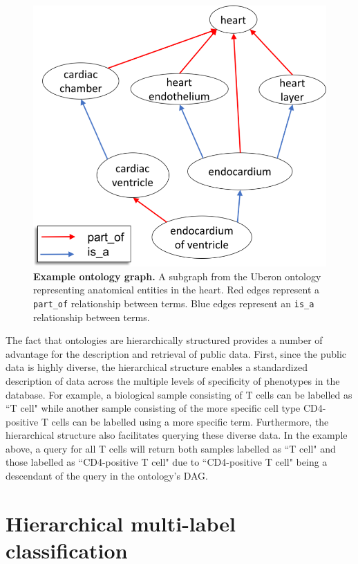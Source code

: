 \begin{figure}[!tpb]
\centerline{\includegraphics[scale=0.68]{figures/onto_schematic.png}}
\caption{\textbf{Example ontology graph.} A subgraph from the Uberon ontology representing anatomical entities in the heart. Red edges represent a \texttt{part\_of} relationship between terms. Blue edges represent an \texttt{is\_a} relationship between terms. }
\label{fig:onto_schem}
\end{figure}

The fact that ontologies are hierarchically structured provides a number of advantage for the description and retrieval of public data. First, since the public data is highly diverse, the hierarchical structure enables a standardized description of data across the multiple levels of specificity of phenotypes in the database.  For example, a biological sample consisting of T cells can be labelled as ``T cell" while another sample consisting of the more specific cell type CD4-positive T cells can be labelled using a more specific term. Furthermore, the hierarchical structure also facilitates querying these diverse data. In the example above, a query for all T cells will return both samples labelled as ``T cell" and those labelled as ``CD4-positive T cell" due to ``CD4-positive T cell" being a descendant of the query in the ontology's DAG.



\section{Hierarchical multi-label classification}

